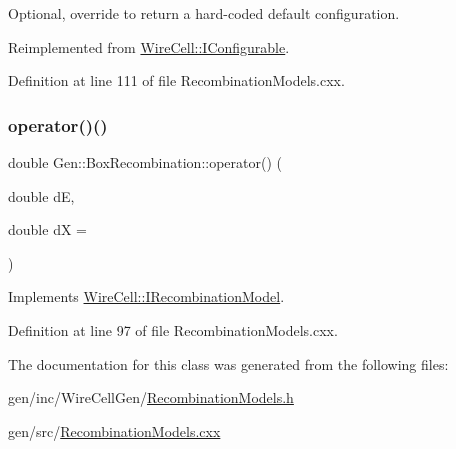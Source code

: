 Optional, override to return a hard-\/coded default configuration. 



Reimplemented from \hyperlink{class_wire_cell_1_1_i_configurable_a54841b2da3d1ea02189478bff96f7998}{Wire\+Cell\+::\+I\+Configurable}.



Definition at line 111 of file Recombination\+Models.\+cxx.

\mbox{\label{class_wire_cell_1_1_gen_1_1_box_recombination_a9a7af321804662d507787c83b40dc1cb}} 
\subsubsection{\texorpdfstring{operator()()}{operator()()}}
{\footnotesize\ttfamily double Gen\+::\+Box\+Recombination\+::operator() (\begin{DoxyParamCaption}\item[{double}]{dE,  }\item[{double}]{dX = {} }\end{DoxyParamCaption})\hspace{0.3cm}{\ttfamily [virtual]}}



Implements \hyperlink{class_wire_cell_1_1_i_recombination_model_a600558009b672e93219962f364829e00}{Wire\+Cell\+::\+I\+Recombination\+Model}.



Definition at line 97 of file Recombination\+Models.\+cxx.



The documentation for this class was generated from the following files\+:\begin{DoxyCompactItemize}
\item 
gen/inc/\+Wire\+Cell\+Gen/\hyperlink{_recombination_models_8h}{Recombination\+Models.\+h}\item 
gen/src/\hyperlink{_recombination_models_8cxx}{Recombination\+Models.\+cxx}\end{DoxyCompactItemize}
